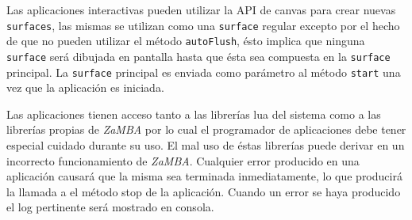 Las aplicaciones interactivas pueden utilizar la API de canvas para crear nuevas \texttt{surfaces}, las mismas se utilizan como una \texttt{surface} regular excepto por el hecho de que no pueden utilizar el método \texttt{autoFlush}, ésto implica que ninguna \texttt{surface} será dibujada en pantalla hasta que ésta sea compuesta en la \texttt{surface} principal. La \texttt{surface} principal es enviada como parámetro al método \texttt{start} una vez que la aplicación es iniciada.

Las aplicaciones tienen acceso tanto a las librerías lua del sistema como a las librerías propias de \emph{ZaMBA} por lo cual el programador de aplicaciones debe tener especial cuidado durante su uso. El mal uso de éstas librerías puede derivar en un incorrecto funcionamiento de \emph{ZaMBA}. Cualquier error producido en una aplicación causará que la misma sea terminada inmediatamente, lo que producirá la llamada a el método stop de la aplicación. Cuando un error se haya producido el log pertinente será mostrado en consola.

